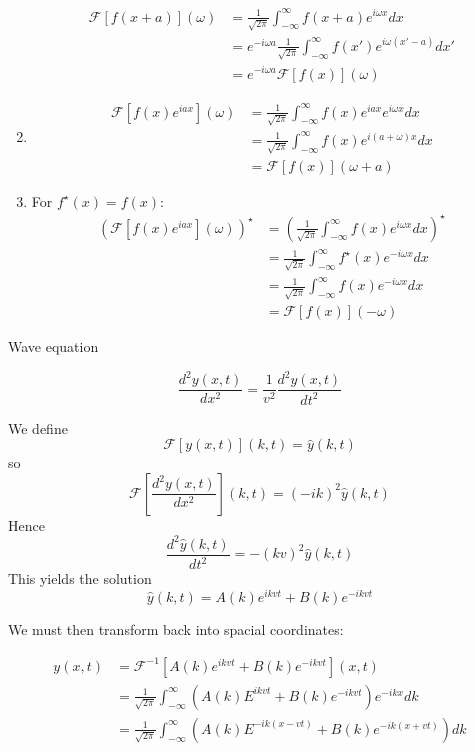\documentclass{physics_notes}
\begin{document}
\begin{enumerate}
{	\begin{align*}
	\mathcal{F}\left[f(x+a)\right](\omega) &= \frac{1}{\sqrt{2\pi}} \int_{-\infty}^\infty f(x+a)e^{i\omega x} dx \\
	&= e^{-i\omega a}\frac{1}{\sqrt{2\pi}} \int_{-\infty}^\infty f(x') e^{i\omega (x'-a)}dx' \\
	&= e^{-i\omega a}\mathcal{F}\left[f(x)\right]\left(\omega\right)
	\end{align*}}
	\item{
	\begin{align*}
	\mathcal{F}\left[f(x) e^{iax}\right](\omega) &= \frac{1}{\sqrt{2\pi}} \int_{-\infty}^\infty f(x)e^{iax}e^{i\omega x} dx \\
	&= \frac{1}{\sqrt{2\pi}} \int_{-\infty}^\infty f(x) e^{i(a + \omega)x}dx \\
	&=\mathcal{F}\left[f(x)\right]\left(\omega + a\right)
	\end{align*}}
	\item{For $f^\star(x) = f(x)$:
	\begin{align*}
	\left(\mathcal{F}\left[f(x) e^{iax}\right](\omega)\right)^\star &= \left(\frac{1}{\sqrt{2\pi}} \int_{-\infty}^\infty f(x)e^{i\omega x} dx \right)^\star\\
	&= \frac{1}{\sqrt{2\pi}} \int_{-\infty}^\infty f^\star(x)e^{-i\omega x} dx \\
	&= \frac{1}{\sqrt{2\pi}} \int_{-\infty}^\infty f(x)e^{-i\omega x} dx \\
	&=\mathcal{F}\left[f(x)\right](-\omega)
	\end{align*}}
\end{enumerate}

\begin{example}{Wave equation}

\begin{equation*}
\frac{d^2y(x,t)}{dx^2} = \frac{1}{v^2}\frac{d^2y(x,t)}{dt^2}
\end{equation*}

We define \[\mathcal{F}[y(x,t)](k,t) = \hat{y}(k,t)\] so \[\mathcal{F}\left[\frac{d^2y(x,t)}{dx^2}\right](k,t) = (-ik)^2\hat{y}(k,t)\] Hence \[\frac{d^2\hat{y}(k,t)}{dt^2} = -(kv)^2\hat{y}(k,t)\] This yields the solution \[\hat{y}(k,t) = A(k)e^{ikvt} + B(k)e^{-ikvt}\]

We must then transform back into spacial coordinates:

\begin{align*}
y(x,t) &= \mathcal{F}^{-1}\left[A(k)e^{ikvt} + B(k)e^{-ikvt}\right](x,t) \\
&= \frac{1}{\sqrt{2\pi}}\int_{-\infty}^\infty \left(A(k)E^{ikvt} + B(k)e^{-ikvt}\right)e^{-ikx} dk \\
&= \frac{1}{\sqrt{2\pi}}\int_{-\infty}^\infty \left(A(k)E^{-ik(x - vt)} + B(k)e^{-ik(x + vt)}\right)dk \\
\end{align*}
\end{example}
\end{document}
